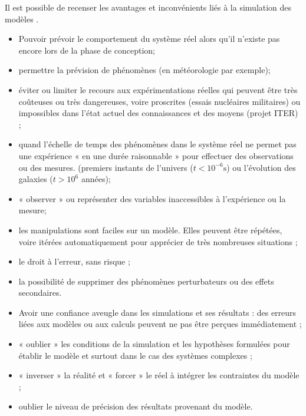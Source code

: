 Il est possible de recenser les avantages et inconvénients liés à la simulation des modèles . 
\begin{itemize}[label=]
\item Pouvoir prévoir le comportement du système réel alors qu'il n’existe pas encore lors de la phase de conception;
\item permettre la prévision de phénomènes (en météorologie par exemple);
\item éviter ou limiter le recours aux expérimentations réelles qui peuvent être très
coûteuses ou très dangereuses, voire proscrites (essais nucléaires militaires) ou
impossibles dans l’état actuel des connaissances et des moyens (projet ITER) ;
\item quand l’échelle de temps des phénomènes dans le système réel ne permet pas une
expérience « en une durée raisonnable » pour effectuer des observations ou des mesures.
(premiers instants de l’univers ($t < 10^{-6} \text{s}$) ou l'évolution des galaxies
($t>10^6$ années);
\item « observer » ou représenter des variables inaccessibles à l'expérience ou la mesure;
\item les manipulations sont faciles sur un modèle. Elles peuvent être répétées, voire itérées
automatiquement pour apprécier de très nombreuses situations ;
\item le droit à l’erreur, sans risque ;
\item la possibilité de supprimer des phénomènes perturbateurs ou des effets
secondaires.
\end{itemize}

\begin{itemize}[label=]
\item Avoir une confiance aveugle dans les simulations et ses résultats : des erreurs liées aux
modèles ou aux calculs peuvent ne pas être perçues immédiatement ;
\item « oublier » les conditions de la simulation et les hypothèses formulées pour établir le
modèle et surtout dans le cas des systèmes complexes ;
\item « inverser » la réalité et « forcer » le réel à intégrer les contraintes du modèle ;
\item oublier le niveau de précision des résultats provenant du modèle.
\end{itemize}


